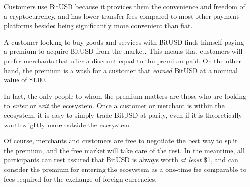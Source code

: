 Customers use BitUSD because it provides them the convenience and freedom of a
cryptocurrency, and has lower transfer fees compared to most other payment
platforms besides being significantly more convenient than fiat.

A customer looking to buy goods and services with BitUSD finds himself paying a
premium to acquire BitUSD from the market. This means that customers will
prefer merchants that offer a discount equal to the premium paid. On the other
hand, the premium is a wash for a customer that \emph{earned} BitUSD at a
nominal value of \$1.00.

In fact, the only people to whom the premium matters are those who are looking
to \emph{enter} or \emph{exit} the ecosystem. Once a customer or merchant is
within the ecosystem, it is easy to simply trade BitUSD at parity, even if it
is theoretically worth slightly more outside the ecosystem.

Of course, merchants and customers are free to negotiate the best way to split
the premium, and the free market will take care of the rest. In the meantime,
all participants can rest assured that BitUSD is always worth \emph{at least}
\$1, and can consider the premium for entering the ecosystem as a one-time fee
comparable to fees required for the exchange of foreign currencies.
